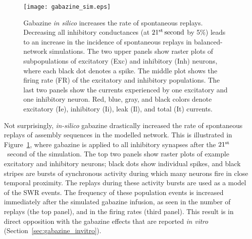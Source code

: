     \begin{figure}
      \center
      \texttt{[image: gabazine\_sim.eps]}
      \caption{
        Gabazine {\it in silico} increases the rate of spontaneous replays.
        Decreasing all inhibitory conductances (at $21^{\rm st}\, \rm second$
        by 5\%) leads to an increase in the incidence of spontaneous replays in
        balanced-network simulations. The two upper panels show raster plots of
        subpopulations of excitatory (Exc) and inhibitory (Inh) neurons, where
        each black dot denotes a spike. The middle plot shows the firing rate
        (FR) of the excitatory and inhibitory populations. The last two panels
        show the currents experienced by one excitatory and one inhibitory
        neuron. Red, blue, gray, and black colors denote excitatory (Ie),
        inhibitory (Ii), leak (Il), and total (It) currents.
            }
    \label{fig:gabazine_sim}
    \end{figure}

    Not surprisingly, \textit{in-silico} gabazine drastically increased the rate
    of spontaneous replays of assembly sequences in the modelled network. This
    is illustrated in Figure~\ref{fig:gabazine_sim}, where gabazine is applied
    to all inhibitory synapses after the $21^{\rm st}$~second of the
    simulation. The top two panels show raster plots of example excitatory and
    inhibitory neurons; black dots show individual spikes, and black
    stripes are bursts of synchronous activity during which many neurons fire in
    close temporal proximity. The replays during these activity bursts are used
    as a model of the SWR events. The frequency of these population
    events is increased immediately after the simulated gabazine infusion, as
    seen in the number of replays (the top panel), and in the firing rates
    (third panel). This result is in direct opposition with the gabazine
    effects that are reported \textit{in vitro}
    (Section~\ref{sec:gabazine_invitro}).

